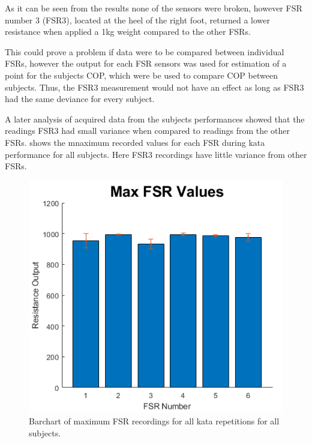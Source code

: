 As it can be seen from the results none of the sensors were broken, however FSR number 3 (FSR3), located at the heel of the right foot, returned a lower resistance when applied a 1kg weight compared to the other FSRs.



This could prove a problem if data were to be compared between individual FSRs, however the output for each FSR sensors was used for estimation of a point for the subjects COP, which were be used to compare COP between subjects. Thus, the FSR3 measurement would not have an effect as long as FSR3 had the same deviance for every subject. 

A later analysis of acquired data from the subjects performances showed that the readings FSR3 had small variance when compared to readings from the other FSRs.  shows the mnaximum recorded values for each FSR during kata performance for all subjects. Here FSR3 recordings have little variance from other FSRs. 

\begin{figure}[H]
	\includegraphics[width=.7\textwidth]{figures/FSRValues}
	\caption{Barchart of maximum FSR recordings for all kata repetitions for all subjects.}
	\label{fig:FSRpostTest}  %
\end{figure}



